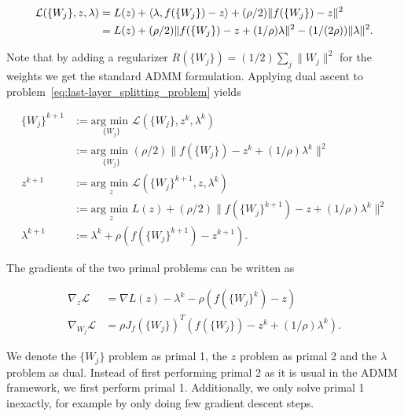 \documentclass[english,11pt,a4paper]{article}
\begin{document}
\begin{equation}
	\begin{aligned}
		\mathcal{L}(\{W_j\}, z, \lambda)
		&= L(z) + \langle \lambda, f(\{W_j\})-z \rangle + (\rho/2)\| f(\{W_j\})-z \|^2 \\
		&= L(z) + (\rho/2) \| f(\{W_j\}) - z + (1/\rho) \lambda \|^2 - (1/(2 \rho)) \| \lambda \|^2.
	\end{aligned}
\end{equation}

Note that by adding a regularizer $R(\{W_j\}) = (1/2) \sum_{j} \| W_j \|^2$ for the weights we get the standard ADMM formulation. Applying dual ascent to problem~\ref{eq:last-layer_splitting_problem} yields

\begin{equation}
	\begin{aligned}
		\{W_j\}^{k+1} &:= \underset{\{W_j\}}{\text{arg min }} \mathcal{L}(\{W_j\}, z^k, \lambda^k) \\
		&:= \underset{\{W_j\}}{\text{arg min }} (\rho/2) \| f(\{W_j\}) - z^k + (1/\rho) \lambda^k \|^2 \\
	
		z^{k+1} &:= \underset{z}{\text{arg min }} \mathcal{L}(\{W_j\}^{k+1}, z, \lambda^k) \\
		&:= \underset{z}{\text{arg min }} L(z) + (\rho/2) \| f(\{W_j\}^{k+1}) - z + (1/\rho) \lambda^k \|^2 \\
		
		\lambda^{k+1} &:= \lambda^k + \rho (f(\{W_j\}^{k+1})-z^{k+1}).
	\end{aligned}
\end{equation}

The gradients of the two primal problems can be written as

\begin{equation}
	\begin{aligned}
		\nabla_z \mathcal{L} &= \nabla L(z) - \lambda^k - \rho (f(\{W_j\}^k) - z) \\
		\nabla_{W_j} \mathcal{L} &= \rho J_f(\{W_j\})^T (f(\{W_j\}) - z^k + (1/\rho) \lambda^k).
	\end{aligned}
\end{equation}

We denote the $\{W_j\}$ problem as primal 1, the $z$ problem as primal 2 and the $\lambda$ problem as dual. Instead of first performing primal 2 as it is usual in the ADMM framework, we first perform primal 1. Additionally, we only solve primal 1 inexactly, for example by only doing few gradient descent steps. \\ \\
\end{document}
